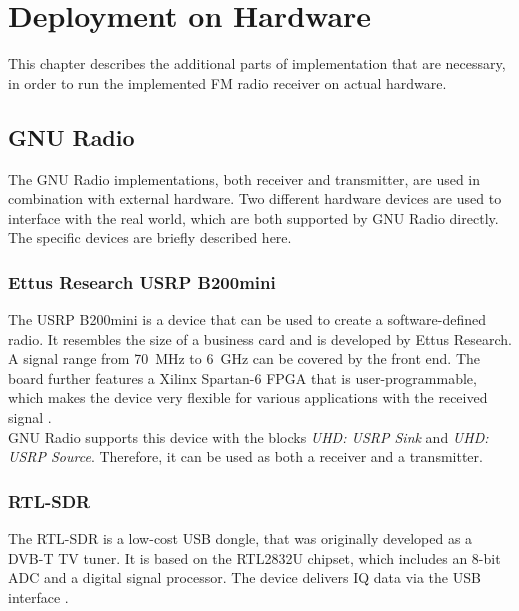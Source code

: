 \chapter{Deployment on Hardware}
\label{cha:DeploymentOnHardware}

This chapter describes the additional parts of implementation that are necessary, in order to run the implemented FM radio receiver on actual hardware.

\section{GNU Radio}
\label{sec:deployment-on-hw:gnu-radio-devices}

The GNU Radio implementations, both receiver and transmitter, are used in combination with external hardware.
Two different hardware devices are used to interface with the real world, which are both supported by GNU Radio directly.
The specific devices are briefly described here.

\subsection{Ettus Research USRP B200mini}

The USRP B200mini is a device that can be used to create a software-defined radio.
It resembles the size of a business card and is developed by Ettus Research.
A signal range from 70~MHz to 6~GHz can be covered by the front end.
The board further features a Xilinx Spartan-6 FPGA that is user-programmable, which makes the device very flexible for various applications with the received signal \cite{USRPb200Mini}.\\

GNU Radio supports this device with the blocks \textit{UHD: USRP Sink} and \textit{UHD: USRP Source}.
Therefore, it can be used as both a receiver and a transmitter.

\subsection{RTL-SDR}

The RTL-SDR is a low-cost USB dongle, that was originally developed as a DVB-T TV tuner.
It is based on the RTL2832U chipset, which includes an 8-bit ADC and a digital signal processor.
The device delivers IQ data via the USB interface \cite{RTLSDR}.\\

